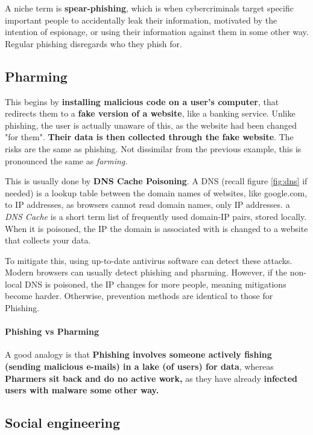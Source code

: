 \documentclass[../main.tex]{subfiles}
\begin{document}
A niche term is \textbf{spear-phishing}, which is when cybercriminals target specific important people to accidentally leak their information, motivated by the intention of espionage, or using their information against them in some other way. Regular phishing disregards who they phish for.

\subsection{Pharming}

This begins by \textbf{installing malicious code on a user's computer}, that redirects them to a \textbf{fake version of a website}, like a banking service. Unlike phishing, the user is actually unaware of this, as the website had been changed "for them". \textbf{Their data is then collected through the fake website}. The risks are the same as phishing. Not dissimilar from the previous example, this is pronounced the same as \emph{farming.}

This is usually done by \textbf{DNS Cache Poisoning}. A DNS (recall figure \ref{fig:dns} if needed) is a lookup table between the domain names of websites, like {\ccmono google.com}, to IP addresses, as browsers cannot read domain names, only IP addresses. a \emph{DNS Cache} is a short term list of frequently used domain-IP pairs, stored locally. When it is poisoned, the IP the domain is associated with is changed to a website that collects your data.

To mitigate this, using up-to-date antivirus software can detect these attacks. Modern browsers can usually detect phishing and pharming. However, if the non-local DNS is poisoned, the IP changes for more people, meaning mitigations become harder. Otherwise, prevention methods are identical to those for Phishing.

\paragraph{Phishing vs Pharming}

A good analogy is that \textbf{Phishing involves someone actively fishing (sending malicious e-mails) in a lake (of users) for data}, whereas \textbf{Pharmers sit back and do no active work,} as they have already \textbf{infected users with malware some other way.}

\subsection{Social engineering}
\end{document}
